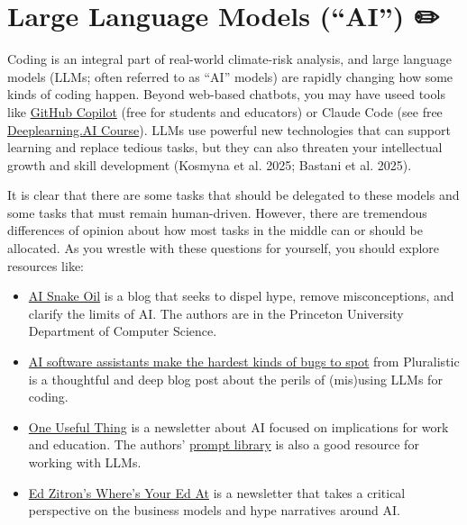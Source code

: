 \documentclass[
  letterpaper,
  DIV=11,
  numbers=noendperiod]{scrreprt}
\providecommand{\tightlist}{%
  \setlength{\itemsep}{0pt}\setlength{\parskip}{0pt}}
\begin{document}
\chapter{Large Language Models (``AI'')
✏️}\label{large-language-models-ai}

Coding is an integral part of real-world climate-risk analysis, and
large language models (LLMs; often referred to as ``AI'' models) are
rapidly changing how some kinds of coding happen. Beyond web-based
chatbots, you may have useed tools like
\href{https://github.com/features/copilot}{GitHub Copilot} (free for
students and educators) or Claude Code (see free
\href{https://www.deeplearning.ai/short-courses/claude-code-a-highly-agentic-coding-assistant/}{Deeplearning.AI
Course}). LLMs use powerful new technologies that can support learning
and replace tedious tasks, but they can also threaten your intellectual
growth and skill development (Kosmyna et al. 2025; Bastani et al. 2025).

It is clear that there are some tasks that should be delegated to these
models and some tasks that must remain human-driven. However, there are
tremendous differences of opinion about how most tasks in the middle can
or should be allocated. As you wrestle with these questions for
yourself, you should explore resources like:

\begin{itemize}
\tightlist
\item
  \href{https://www.aisnakeoil.com/}{AI Snake Oil} is a blog that seeks
  to dispel hype, remove misconceptions, and clarify the limits of AI.
  The authors are in the Princeton University Department of Computer
  Science.
\item
  \href{https://pluralistic.net/2025/08/04/bad-vibe-coding/\#maximally-codelike-bugs}{AI
  software assistants make the hardest kinds of bugs to spot} from
  Pluralistic is a thoughtful and deep blog post about the perils of
  (mis)using LLMs for coding.
\item
  \href{https://www.oneusefulthing.org/}{One Useful Thing} is a
  newsletter about AI focused on implications for work and education.
  The authors' \href{https://www.moreusefulthings.com/prompts}{prompt
  library} is also a good resource for working with LLMs.
\item
  \href{https://www.wheresyoured.at/}{Ed Zitron's Where's Your Ed At} is
  a newsletter that takes a critical perspective on the business models
  and hype narratives around AI.
\end{itemize}
\end{document}
